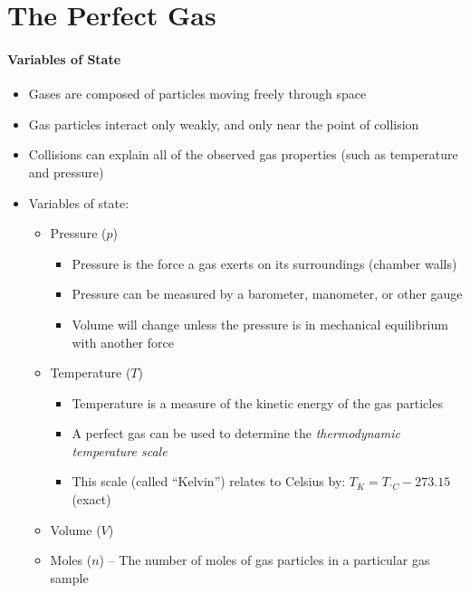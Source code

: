 \documentclass[12pt, openany, letterpaper]{memoir}
\begin{document}
\section{The Perfect Gas}
\paragraph{Variables of State}
\begin{itemize}
	\item Gases are composed of particles moving freely through space
	\item Gas particles interact only weakly, and only near the point of collision
	\item Collisions can explain all of the observed gas properties (such as temperature and pressure)
	\item Variables of state:
	      \begin{itemize}
		      \item Pressure ($p$)
		            \begin{itemize}
			            \item Pressure is the force a gas exerts on its surroundings (chamber walls)
			            \item Pressure can be measured by a barometer, manometer, or other gauge
			            \item Volume will change unless the pressure is in mechanical equilibrium with another force
		            \end{itemize}
		      \item Temperature ($T$)
		            \begin{itemize}
			            \item Temperature is a measure of the kinetic energy of the gas particles
			            \item A perfect gas can be used to determine the \emph{thermodynamic temperature scale}
			            \item This scale (called ``Kelvin'') relates to Celsius by: $T_K = T_{^\circ C} - 273.15$ (exact)
		            \end{itemize}
		      \item Volume ($V$)
		      \item Moles ($n$) -- The number of moles of gas particles in a particular gas sample
	      \end{itemize}
\end{itemize}
\end{document}
